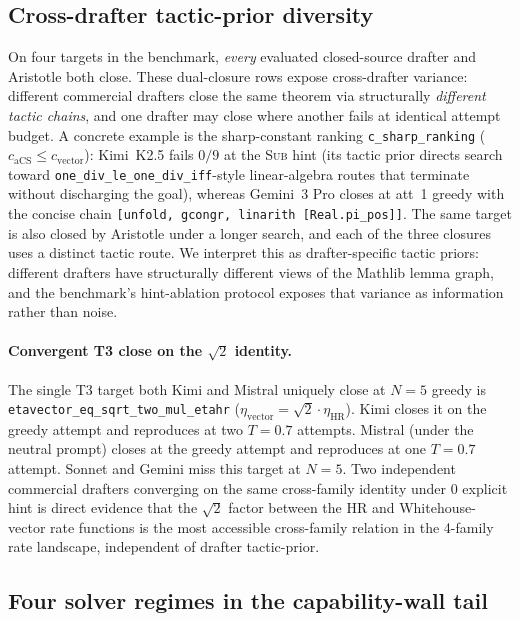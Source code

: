\subsection{Cross-drafter tactic-prior diversity}
\label{app:cross-drafter}

On four targets in the benchmark, \emph{every} evaluated closed-source
drafter and Aristotle both close. These dual-closure rows expose
cross-drafter variance: different commercial drafters
close the same theorem via structurally \emph{different tactic chains},
and one drafter may close where another fails at identical attempt
budget. A concrete example is the sharp-constant ranking
\texttt{c\_sharp\_ranking} ($c_{\mathrm{aCS}} \leq c_{\mathrm{vector}}$):
Kimi~K2.5 fails $0/9$ at the \textsc{Sub} hint (its tactic prior directs
search toward \texttt{one\_div\_le\_one\_div\_iff}-style
linear-algebra routes that terminate without discharging the goal),
whereas Gemini~3 Pro closes at att~1 greedy with the concise chain
\texttt{[unfold, gcongr, linarith [Real.pi\_pos]]}. The same target
is also closed by Aristotle under a longer search, and each
of the three closures uses a distinct tactic route. We interpret this
as drafter-specific tactic priors: different drafters have
structurally different views of the Mathlib lemma graph, and the
benchmark's hint-ablation protocol exposes that variance as
information rather than noise.

\paragraph{Convergent T3 close on the $\sqrt{2}$ identity.}
The single T3 target both Kimi and Mistral uniquely close at
$N=5$ greedy is \texttt{etavector\_eq\_sqrt\_two\_mul\_etahr}
($\eta_{\mathrm{vector}} = \sqrt{2}\cdot\eta_{\mathrm{HR}}$). Kimi
closes it on the greedy attempt and reproduces at two $T=0.7$
attempts. Mistral (under the neutral prompt) closes at the greedy
attempt and reproduces at one $T=0.7$ attempt. Sonnet and Gemini
miss this target at $N=5$. Two independent commercial drafters
converging on the same cross-family identity under $0$ explicit
hint is direct evidence that the $\sqrt{2}$ factor between the
HR and Whitehouse-vector rate functions is the most accessible
cross-family relation in the 4-family rate landscape, independent
of drafter tactic-prior.

\subsection{Four solver regimes in the capability-wall tail}
\label{app:four-regimes}

